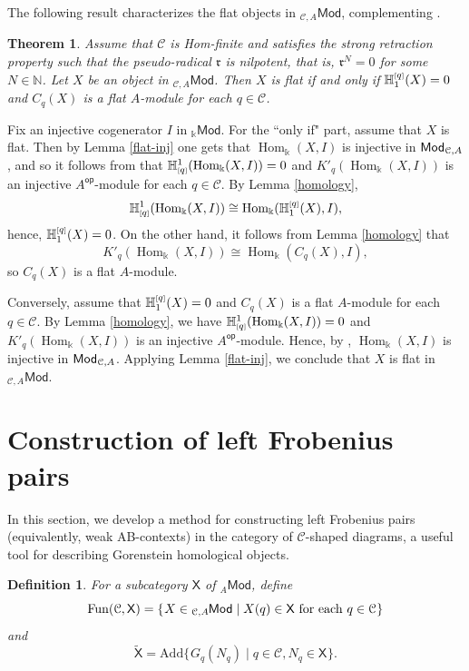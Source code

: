 \documentclass{amsart}
\theoremstyle{bfupright head,slanted body}
\theoremstyle{bfupright head,upright body}
\theoremstyle{fixed bf head,slanted body}
\newtheorem{thm}[res]{Theorem}          \newtheorem*{thm*}{Theorem}
\theoremstyle{fixed bf head,upright body}
\newtheorem{dfn}[res]{Definition}       \newtheorem*{dfn*}{Definition}
\theoremstyle{numbered paragraph}
\newenvironment{prf*}[1][Proof]{%
	\begin{proof}[\bf #1]
		\setcounter{equation}{0}
		\renewcommand{\theequation}{\arabic{equation}}}
	{\end{proof}
}
\numberwithin{equation}{res}
\newcommand{\setof}[3][\mspace{1mu}]{\{#1#2 \mid #3#1\}}
\newcommand{\Mod}[1]{{_{#1}\mathsf{Mod}}}
\newcommand{\Hom}[3][]{\operatorname{Hom}_{#1}(#2,#3)}
\newcommand{\hH}[2][1]{\mathbb{H}_{#1}^{\textnormal{\tiny[}#2\textnormal{\tiny]}}}
\newcommand{\cH}[2][1]{\mathbb{H}^{#1}_{\textnormal{\tiny[}#2\textnormal{\tiny]}}}
\newcommand{\Add}{\mathrm{Add}}
\newcommand{\Fun}{\mathrm{Fun}}
\newcommand{\X}{\mathsf{X}}
\newcommand{\C}{\mathcal{C}}
\newcommand{\is}{\cong}
\newcommand{\lMod}[1]{{}_{#1}\mspace{-1mu}{\sf{Mod}}}
\newcommand{\rMod}[1]{{\sf{Mod}}_{#1}}
\newcommand{\Aop}{A^{\mathsf{op}}}
\begin{document}
The following result characterizes the flat objects in $\Mod{\C,A}$, complementing \cite[Theorem 7.29]{HJ21}.

\begin{thm}\label{flat2}
Assume that $\C$ is Hom-finite and satisfies the strong retraction property such that the pseudo-radical $\mathfrak{r}$ is nilpotent, that is, $\mathfrak{r}^N=0$ for some $N\in\mathbb{N}$. Let $X$ be an object in $\Mod{\C,A}$. Then $X$ is flat if and only if $\hH[1]{q}(X)=0$ and $C_q(X)$ is a flat $A$-module for each $q\in\C$.
\end{thm}
\begin{prf*}
Fix an injective cogenerator $I$ in $\Mod{\Bbbk}$. For the ``only if" part, assume that $X$ is flat. Then by Lemma \ref{flat-inj} one gets that $\Hom[\Bbbk]{X}{I}$ is injective in $\rMod{\C,A}$, and so it follows from \cite[Theorem 7.29(b)] {HJ21} that $\cH[1]{q}(\Hom[\Bbbk]{X}{I})=0$ and $K'_q(\Hom[\Bbbk]{X}{I})$ is an injective $\Aop$-module for each $q\in\C$.
By Lemma \ref{homology},
$$\cH[1]{q}(\Hom[\Bbbk]{X}{I})\is \Hom[\Bbbk]{\hH[1]{q}(X)}{I},$$
hence, $\hH[1]{q}(X)=0$. On the other hand, it follows from Lemma \ref{homology} that $$K'_q(\Hom[\Bbbk]{X}{I})\is\Hom[\Bbbk]{C_q(X)}{I},$$
so $C_q(X)$
is a flat $A$-module.

Conversely, assume that $\hH[1]{q}(X)=0$ and $C_q(X)$ is a flat $A$-module for each $q\in\C$. By Lemma \ref{homology}, we have $\cH[1]{q}(\Hom[\Bbbk]{X}{I})=0$ and $K'_q(\Hom[\Bbbk]{X}{I})$ is an injective $\Aop$-module. Hence, by \cite[Theorem 7.29(b)] {HJ21}, $\Hom[\Bbbk]{X}{I}$ is injective in $\rMod{\C,A}$. Applying Lemma \ref{flat-inj}, we conclude that $X$ is flat in $\Mod{\C,A}$.
\end{prf*}

\section{Construction of left Frobenius pairs}
\noindent
In this section, we develop a method for constructing left Frobenius pairs (equivalently, weak AB-contexts) in the category of $\C$-shaped diagrams, a useful tool for describing Gorenstein homological objects.

\begin{dfn}
For a subcategory $\X$ of $\Mod{A}$, define
\[\Fun(\C,\X)=\setof{X\in{\lMod{\C,A}}}{X(q)\in{\X}\ \mathrm{for\ each}\ q\in\C}\]
and
\[{\widetilde{\X}}=\Add\setof{G_q(N_q)}{q\in\C, N_q\in\X}.\]
\end{dfn}
\end{document}
